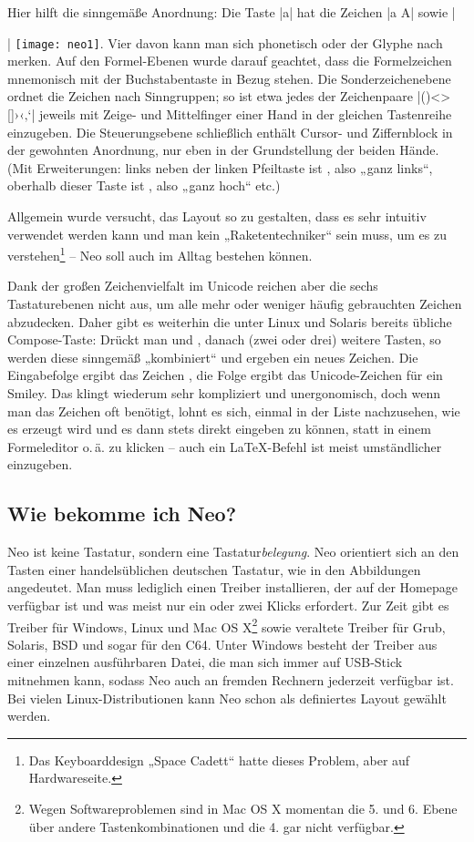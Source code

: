 \documentclass[ngerman]{dtk}
\newcommand{\taste}[1]{\makebox{\textsf{#1}}}
\begin{document}
Hier hilft die sinngemäße Anordnung: Die Taste |a| hat die Zeichen |a A| sowie |{| \texttt{[image: neo1]}. Vier davon kann man sich phonetisch oder der Glyphe nach merken. Auf den Formel-Ebenen wurde darauf geachtet, dass die Formelzeichen mnemonisch mit der Buchstabentaste in Bezug stehen.  Die Sonderzeichenebene ordnet die Zeichen nach Sinngruppen; so ist etwa jedes der Zeichenpaare |()<>{}[]›‹‚‘| jeweils mit Zeige- und Mittelfinger einer Hand in der gleichen Tastenreihe einzugeben.  Die Steuerungsebene schließlich enthält Cursor- und Ziffernblock in der gewohnten Anordnung, nur eben in der Grundstellung der beiden Hände. (Mit Erweiterungen: links neben der linken Pfeiltaste ist \taste{Pos 1}, also „ganz links“, oberhalb dieser Taste ist \taste{Bild hoch}, also „ganz hoch“ etc.)

Allgemein wurde versucht, das Layout so zu gestalten, dass es sehr intuitiv verwendet werden kann und man kein „Raketentechniker“ sein muss, um es zu verstehen\footnote{Das Keyboarddesign „Space Cadett“ hatte dieses Problem, aber auf Hardwareseite.} – Neo soll auch im Alltag bestehen können.

Dank der großen Zeichenvielfalt im Unicode reichen aber die sechs Tastaturebenen nicht aus, um alle mehr oder weniger häufig gebrauchten Zeichen abzudecken. Daher gibt es weiterhin die unter Linux und Solaris bereits übliche Compose-Taste: Drückt man \taste{Mod 3} und \taste{Tab}, danach (zwei oder drei) weitere Tasten, so werden diese sinngemäß „kombiniert“ und ergeben ein neues Zeichen. Die Eingabefolge \taste{Compose a e} ergibt das Zeichen \taste{æ}, die Folge \taste{Compose : )} ergibt das Unicode-Zeichen für ein Smiley. Das klingt wiederum sehr kompliziert und unergonomisch, doch wenn man das Zeichen oft benötigt, lohnt es sich, einmal in der Liste nachzusehen, wie es erzeugt wird und es dann stets direkt eingeben zu können, statt in einem Formeleditor o.\,ä. zu klicken – auch ein \LaTeX-Befehl ist meist umständlicher einzugeben.

\subsection{Wie bekomme ich Neo?}
Neo ist keine Tastatur, sondern eine Tastatur\emph{belegung}. Neo orientiert sich an den Tasten einer handelsüblichen deutschen Tastatur, wie in den Abbildungen angedeutet. Man muss lediglich einen Treiber installieren, der auf der Homepage verfügbar ist und was meist nur ein oder zwei Klicks erfordert. Zur Zeit gibt es Treiber für Windows, Linux und Mac OS X\footnote{Wegen Softwareproblemen sind in Mac OS X momentan die 5. und 6. Ebene über andere Tastenkombinationen und die 4. gar nicht verfügbar.} sowie veraltete Treiber für Grub, Solaris, BSD und sogar für den C64. Unter Windows besteht der Treiber aus einer einzelnen ausführbaren Datei, die man sich immer auf USB-Stick mitnehmen kann, sodass Neo auch an fremden Rechnern jederzeit verfügbar ist. Bei vielen Linux-Distributionen kann Neo schon als definiertes Layout gewählt werden.

}
\end{document}

